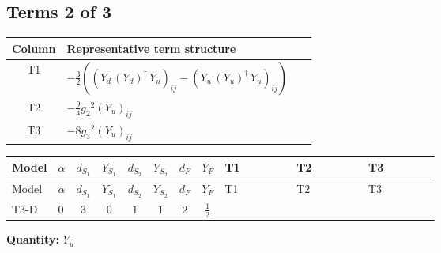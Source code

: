 \documentclass[8pt]{article}
\begin{document}
\begin{landscape}
\subsection*{Terms 2 of 3}
\begin{center}
\begin{tabular}{@{}c >{\raggedright\arraybackslash}p{0.82\linewidth}@{}}
\toprule
Column & Representative term structure \\
\midrule
T1 & \(\displaystyle -\frac{3}{2} (\left({Y_d}\,\left({Y_d}\right)^{\dagger}\,{Y_u}\right)_{ij}-\left({Y_u}\,\left({Y_u}\right)^{\dagger}\,{Y_u}\right)_{ij})\) \\
\midrule
T2 & \(\displaystyle -\frac{9}{4} {g_2}^2 \left({Y_u}\right)_{ij}\) \\
\midrule
T3 & \(\displaystyle -8 {g_3}^2 \left({Y_u}\right)_{ij}\) \\
\midrule
\bottomrule
\end{tabular}
\end{center}
\smallskip
\tiny
\begin{longtable}{@{}llcccccc >{\raggedright\arraybackslash}p{0.21\linewidth} >{\raggedright\arraybackslash}p{0.21\linewidth} >{\raggedright\arraybackslash}p{0.21\linewidth}@{}}
\toprule
Model & $\alpha$ & $d_{S_1}$ & $Y_{S_1}$ & $d_{S_2}$ & $Y_{S_2}$ & $d_F$ & $Y_F$ & T1 & T2 & T3 \\
\midrule
\endfirsthead
\toprule
Model & $\alpha$ & $d_{S_1}$ & $Y_{S_1}$ & $d_{S_2}$ & $Y_{S_2}$ & $d_F$ & $Y_F$ & T1 & T2 & T3 \\
\midrule
\endhead
T3-D & $0$ & $3$ & $0$ & $1$ & $1$ & $2$ & $\frac{1}{2}$ & \scriptsize\adjustbox{max width=\linewidth}{$\begin{gathered} -\frac{3}{2} (\left({Y_d}\,\left({Y_d}\right)^{\dagger}\,{Y_u}\right)_{ij}-\left({Y_u}\,\left({Y_u}\right)^{\dagger}\,{Y_u}\right)_{ij})\end{gathered}$} & \scriptsize\adjustbox{max width=\linewidth}{$\begin{gathered} -\frac{9}{4} {g_2}^2 \left({Y_u}\right)_{ij}\end{gathered}$} & \scriptsize\adjustbox{max width=\linewidth}{$\begin{gathered} -8 {g_3}^2 \left({Y_u}\right)_{ij}\end{gathered}$} \\
\midrule
\bottomrule
\end{longtable}
\clearpage
\noindent\textbf{Quantity: }$Y_u$\par\smallskip

\end{landscape}
\end{document}
